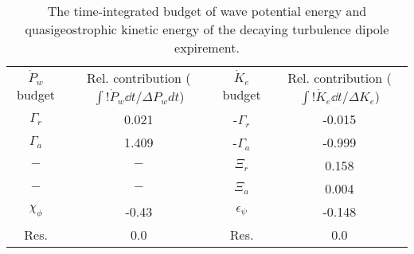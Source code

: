 \begin{table}
\begin{center}
\caption{The time-integrated budget of wave potential energy and quasigeostrophic                kinetic energy of the decaying turbulence dipole expirement. \label{table2}}
\begin{tabular}{cccc}
$\dot{P}_w$ budget & Rel. contribution ($\int!\dot{P}_w \dd t/\Delta P_w dt$) & $\dot{K}_e$ budget & Rel. contribution ($\int!\dot{K}_e \dd t/\Delta K_e$) \\
$\Gamma_r$ & 0.021 & -$\Gamma_r$ & -0.015 \\
$\Gamma_a$ & 1.409 & -$\Gamma_a$ & -0.999 \\
$-$ & $-$ & $\Xi_r$ & 0.158 \\
$-$ & $-$ & $\Xi_a$ & 0.004 \\
$\chi_\phi$ & -0.43 & $\epsilon_\psi$ & -0.148 \\
Res. & 0.0 & Res. & 0.0 \\
\end{tabular}
\end{center}
\end{table}
